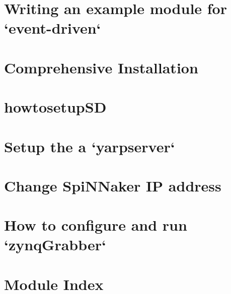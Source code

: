 \documentclass[twoside]{book}
\newcommand{\+}{\discretionary{\mbox{\scriptsize$\hookleftarrow$}}{}{}}
\begin{document}
\chapter{Writing an example module for `event-\/driven`}
\label{md__mnt_d_projects_event-driven_documentation_example_module}

\chapter{Comprehensive Installation}
\label{md__mnt_d_projects_event-driven_documentation_full_installation}

\chapter{howtosetup\+SD}
\label{md__mnt_d_projects_event-driven_documentation_howtosetupSD}

\chapter{Setup the a `yarpserver`}
\label{md__mnt_d_projects_event-driven_documentation_setup_yarpserver}

\chapter{Change Spi\+N\+Naker IP address}
\label{md__mnt_d_projects_event-driven_documentation_SpiNNakerips}

\chapter{How to configure and run `zynq\+Grabber`}
\label{md__mnt_d_projects_event-driven_documentation_zynqGrabber}

\chapter{Module Index}

\end{document}

